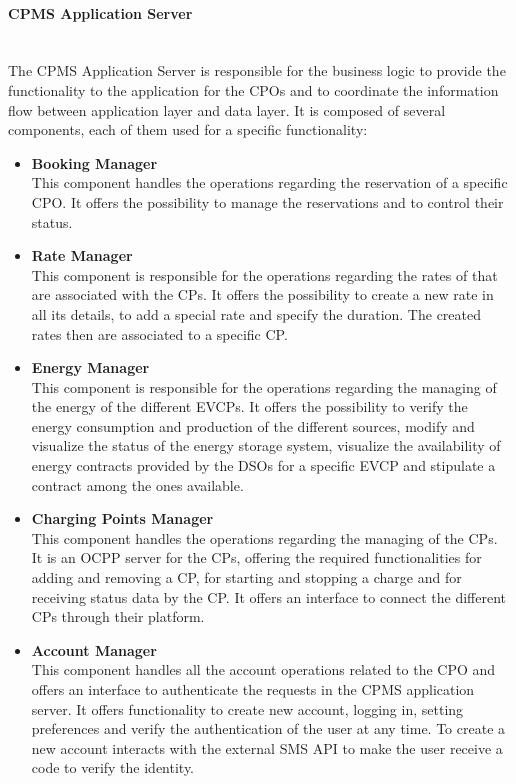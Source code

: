 \paragraph*{CPMS Application Server} \hfill \\
The CPMS Application Server is responsible for the business logic to provide the functionality to the application for the CPOs and to coordinate the information flow between application layer and data layer.
It is composed of several components, each of them used for a specific functionality:\\
\begin{itemize}
    \item \textbf{Booking Manager} \\
    This component handles the operations regarding the reservation of a specific CPO. It offers the possibility to manage the reservations and to control their status.
    \item \textbf{Rate Manager} \\ This component is responsible for the operations regarding the rates of that are associated with the CPs. It offers the possibility to
    create a new rate in all its details, to add a special rate and specify the duration. The created rates then are associated to a specific CP.
    \item \textbf{Energy Manager} \\ This component is responsible for the operations regarding the managing of the energy of the different EVCPs. 
    It offers the possibility to verify the energy consumption and production of the different sources, modify and visualize the status of the energy storage system,
    visualize the availability of energy contracts provided by the DSOs for a specific EVCP and stipulate a contract among the ones available.
    \item \textbf{Charging Points Manager} \\ This component handles the operations regarding the managing of the CPs. It is an OCPP server for the CPs, offering the 
    required functionalities for adding and removing a CP, for starting and stopping a charge and for receiving status data by the CP. It offers an interface to connect the different CPs through their platform.
    \item \textbf{Account Manager} \\ This component handles all the account operations related to the CPO and offers an interface to authenticate the requests in the CPMS application server.
          It offers functionality to create new account, logging in, setting preferences and verify the authentication of the user at any time.
          To create a new account interacts with the external SMS API to make the user receive a code to verify the identity.
\end{itemize}

